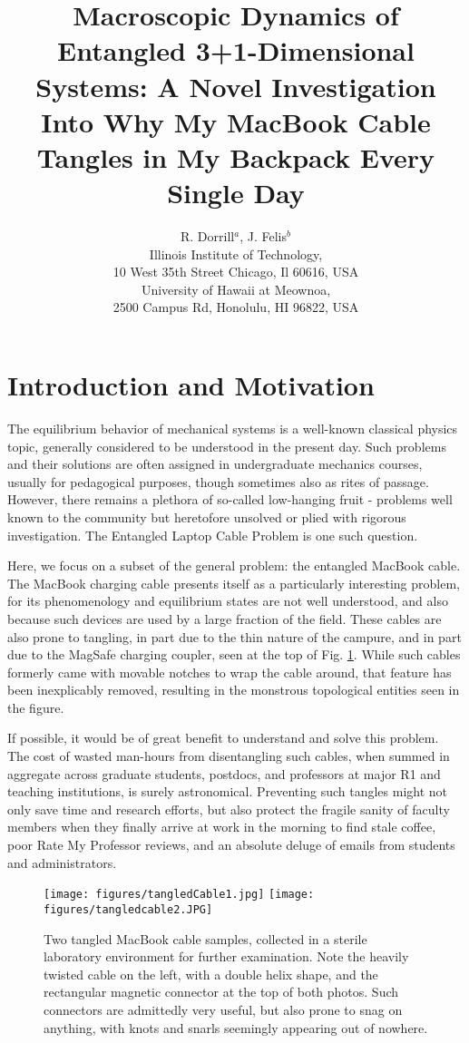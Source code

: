 \documentclass{JINST}
\title{Macroscopic Dynamics of Entangled 3+1-Dimensional Systems: A Novel Investigation Into Why My MacBook Cable Tangles in My Backpack Every Single Day}
\author{ R. Dorrill$^a$, J. Felis$^b$\\ 
\llap{$^a$} Illinois Institute of Technology, \\ 10 West 35th Street Chicago, Il 60616, USA \\
\llap{$^b$} University of Hawaii at Meownoa, \\ 2500 Campus Rd, Honolulu, HI 96822, USA \\
}
\begin{document}
\maketitle
\section{Introduction and Motivation} \label{sec:intro}

The equilibrium behavior of mechanical systems is a well-known classical physics topic, generally considered to be understood in the present day. Such problems and their solutions are often assigned in undergraduate mechanics courses, usually for pedagogical purposes, though sometimes also as rites of passage. However, there remains a plethora of so-called low-hanging fruit - problems well known to the community but heretofore unsolved or plied with rigorous investigation. The Entangled Laptop Cable Problem is one such question. 

Here, we focus on a subset of the general problem: the entangled MacBook cable. The MacBook charging cable presents itself as a particularly interesting problem, for its phenomenology and equilibrium states are not well understood, and also because such devices are used by a large fraction of the field. These cables are also prone to tangling, in part due to the thin nature of the campure, and in part due to the MagSafe charging coupler, seen at the top of Fig. \ref{fig:RealCables}. While such cables formerly came with movable notches to wrap the cable around, that feature has been inexplicably removed, resulting in the monstrous topological entities seen in the figure.

If possible, it would be of great benefit to understand and solve this problem. The cost of wasted man-hours from disentangling such cables, when summed in aggregate across graduate students, postdocs, and professors at major R1 and teaching institutions, is surely astronomical. Preventing such tangles might not only save time and research efforts, but also protect the fragile sanity of faculty members when they finally arrive at work in the morning to find stale coffee, poor Rate My Professor reviews, and an absolute deluge of emails from students and administrators.

\begin{figure}[htb]
    \centering
    \texttt{[image: figures/tangledCable1.jpg]} 
    \texttt{[image: figures/tangledcable2.JPG]} 
    \caption{Two tangled MacBook cable samples, collected in a sterile laboratory environment for further examination. Note the heavily twisted cable on the left, with a double helix shape, and the rectangular magnetic connector at the top of both photos. Such connectors are admittedly very useful, but also prone to snag on anything, with knots and snarls seemingly appearing out of nowhere.}
    \label{fig:RealCables}
\end{figure}
\end{document}
